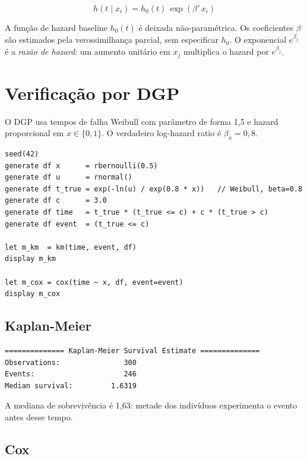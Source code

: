 \[
  h(t \mid x_i) = h_0(t)\,\exp(\beta'\,x_i)
\]

A função de hazard baseline $h_0(t)$ é deixada não-paramétrica. Os
coeficientes $\beta$ são estimados pela verossimilhança parcial, sem
especificar $h_0$. O exponencial $e^{\beta_j}$ é a \emph{razão de hazard}:
um aumento unitário em $x_j$ multiplica o hazard por $e^{\beta_j}$.

\section{Verificação por DGP}

O DGP usa tempos de falha Weibull com parâmetro de forma 1{,}5 e hazard
proporcional em $x \in \{0,1\}$. O verdadeiro log-hazard ratio é $\beta_x = 0{,}8$.

\begin{lstlisting}[caption={DGP de sobrevivência — Weibull com hazard proporcional}]
seed(42)
generate df x      = rbernoulli(0.5)
generate df u      = rnormal()
generate df t_true = exp(-ln(u) / exp(0.8 * x))   // Weibull, beta=0.8
generate df c      = 3.0
generate df time   = t_true * (t_true <= c) + c * (t_true > c)
generate df event  = (t_true <= c)

let m_km  = km(time, event, df)
display m_km

let m_cox = cox(time ~ x, df, event=event)
display m_cox
\end{lstlisting}

\subsection*{Kaplan-Meier}

\begin{lstlisting}[language={}, basicstyle=\ttfamily\small,
  frame=none, numbers=none, backgroundcolor=\color{codbg},
  xleftmargin=0pt, xrightmargin=0pt, breaklines=false]
============== Kaplan-Meier Survival Estimate ==============
Observations:               300
Events:                     246
Median survival:         1.6319
\end{lstlisting}

A mediana de sobrevivência é 1{,}63: metade dos indivíduos experimenta o
evento antes desse tempo.

\subsection*{Cox}

